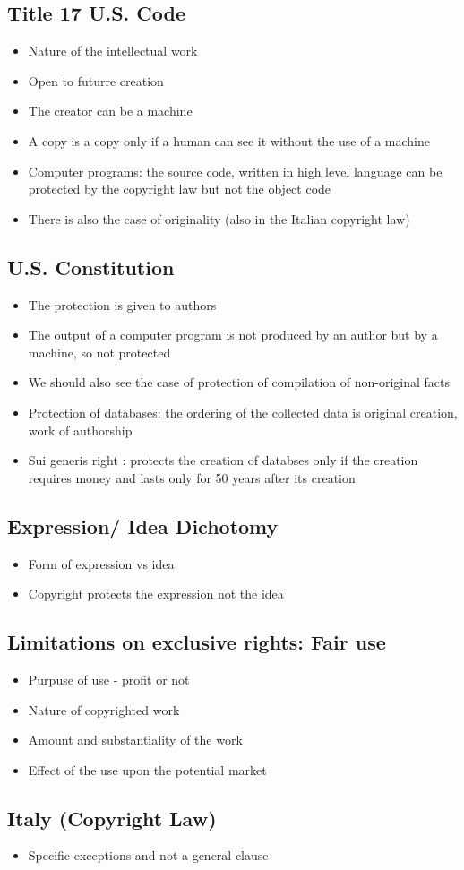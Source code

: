 \documentclass{article}
\begin{document}
\subsection{Title 17 U.S. Code} 
\begin{itemize}
\item Nature of the intellectual work
\item Open to futurre creation 
\item The creator can be a machine 
\item A copy is a copy only if a human can see it without the use of a machine
\item Computer programs: the source code, written in high level language can be protected by the copyright law but not the object code 
\item There is also the case of originality  (also in the Italian copyright law)
\end{itemize}

\subsection{U.S. Constitution} 
\begin{itemize}
\item The protection is given to authors 
\item The output of a computer program is not produced by an author but by a machine, so not protected 
\item We should also see the case of protection of compilation of non-original facts
\item Protection of databases: the ordering of the collected data is original creation, work of authorship
\item Sui generis right : protects the creation of databses only if the creation requires money and lasts only for 50 years after its creation 
\end{itemize}

\subsection{Expression/ Idea Dichotomy}
\begin{itemize}
\item Form of expression vs idea 
\item Copyright protects the expression not the idea 
\end{itemize}


\subsection{Limitations on exclusive rights: Fair use}
\begin{itemize}
\item Purpuse of use - profit or not 
\item Nature of copyrighted work
\item Amount and substantiality of the work
\item Effect of the use upon the potential market 
\end{itemize}

\subsection{Italy (Copyright Law)}
\begin{itemize}
\item Specific exceptions and not a general clause 
\end{itemize}
\end{document}
